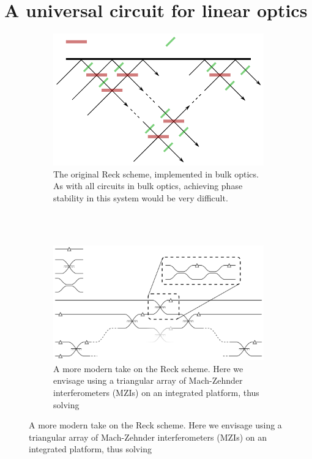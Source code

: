 \section{A universal circuit for linear optics}
\label{sec:ReckScheme}
\begin{figure}[p]
  \begin{subfigure}{\textwidth}
    \centering
    \includegraphics{figures/reck_original}
    \caption{The original Reck scheme, implemented in bulk optics. As with all
    circuits in bulk optics, achieving phase stability in this system would be
    very difficult.}
    \label{fig:ReckOriginal}
  \end{subfigure} \\
  \vspace{1cm} \\
  \begin{subfigure}{\textwidth}
    \centering
    \includegraphics{figures/reck_general}
    \caption{A more modern take on the Reck scheme. Here we envisage using
    a triangular array of
    Mach-Zehnder interferometers (MZIs) on an integrated platform, thus solving
}
\end{subfigure}
\end{figure}
